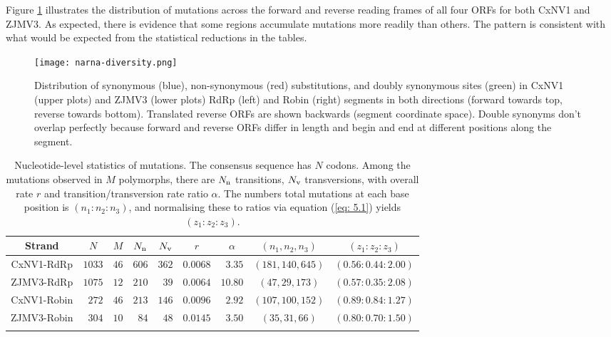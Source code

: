 \documentclass[unnumsec,webpdf,contemporary,large]{oup-authoring-template}%
\theoremstyle{thmstyleone}%
\theoremstyle{thmstyletwo}%
\theoremstyle{thmstylethree}%
\begin{document}
\begin{enumerate}
\end{enumerate}

Figure \ref{fig: 2} illustrates the distribution of mutations across the forward and reverse reading frames
of all four ORFs for both CxNV1 and ZJMV3. As expected, there is evidence that some regions accumulate mutations more readily than others.
The pattern is consistent with what would be expected from the statistical reductions in the tables.

\begin{figure*}
\begin{center}
\texttt{[image: narna-diversity.png]}
\caption{\label{fig: 2}
Distribution of synonymous (blue), non-synonymous (red) substitutions,
and doubly synonymous sites (green) in CxNV1 (upper plots) and ZJMV3 (lower plots)
RdRp (left) and Robin (right) segments in both directions (forward towards top, reverse towards bottom).
Translated reverse ORFs are shown backwards (segment coordinate space). Double synonyms
don't overlap perfectly because forward and reverse ORFs differ in length and begin and end at
different positions along the segment.
}
\end{center}
\end{figure*}

\begin{table*}
\caption{
Nucleotide-level statistics of mutations. The consensus sequence has $N$ codons. Among the mutations
observed in $M$ polymorphs, there are $N_{\rm n}$ transitions, $N_{\rm v}$ transversions, with overall
rate $r$ and transition/transversion rate ratio $\alpha$. The numbers total mutations at each base position
is $(n_1:n_2:n_3)$, and normalising these to ratios via equation (\ref{eq: 5.1}) yields $(z_1:z_2:z_3)$.
\label{tab: 5.1}}
\begin{tabular*}{\textwidth}{@{\extracolsep\fill}crcrrcrcc@{\extracolsep\fill}}
\toprule
Strand&\multicolumn{1}{c}{$N$}&$M$&\multicolumn{1}{c}{$N_{\rm n}$}&\multicolumn{1}{c}{$N_{\rm v}$}
&$r$&\multicolumn{1}{c}{$\alpha$}&$(n_1,n_2,n_3)$&$(z_1:z_2:z_3)$\\
\midrule
CxNV1-RdRp&$1033$  &$46$ &$606$ &$362$&$0.0068$&$3.35$ &$(181,140,645)$&$(0.56:0.44:2.00)$\\
ZJMV3-RdRp&$1075$ &$12$&$210$ &$39$& $0.0064$ &$10.80$ &$(47,29,173)$&$(0.57:0.35:2.08)$\\
CxNV1-Robin&$272$    &$46$ &$213$ &$146$&$0.0096$&$2.92$ &$(107,100,152)$&$(0.89:0.84:1.27)$\\
ZJMV3-Robin&$304$&$10$&$84$&$48$&$0.0145$&$3.50$&$(35,31,66)$&$(0.80:0.70:1.50)$\\
\botrule
\end{tabular*}
\end{table*}
\end{document}
